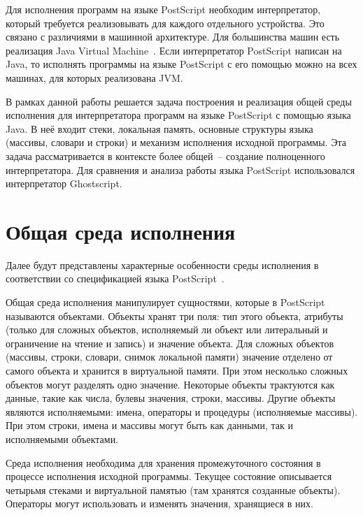 Для исполнения программ на языке PostScript необходим интерпретатор, который требуется реализовывать для каждого отдельного устройства. Это связано с различиями в машинной архитектуре. Для большинства машин есть реализация Java Virtual Machine~\cite{pjvms}. Если интерпретатор PostScript написан на Java, то исполнять программы на языке PostScript с его помощью можно на всех машинах, для которых реализована JVM.

В рамках данной работы решается задача построения и реализация общей среды исполнения для интерпретатора программ на языке PostScript с помощью языка Java. В неё входит стеки, локальная память, основные структуры языка (массивы, словари и строки) и механизм исполнения исходной программы. Эта задача рассматривается в контексте более общей~-- создание полноценного интерпретатора.  Для сравнения и анализа работы языка PostScript использовался интерпретатор Ghostscript.


\section{Общая среда исполнения}
Далее будут представлены характерные особенности среды исполнения в соответствии со спецификацией языка PostScript~\cite{PLRM}.

Общая среда исполнения манипулирует сущностями, которые в PostScript называются  объектами. Объекты хранят три поля: тип этого объекта, атрибуты (только для сложных объектов, исполняемый ли объект или литеральный и ограничение на чтение и запись) и значение объекта. Для сложных объектов (массивы, строки, словари, снимок локальной памяти) значение отделено от самого объекта и хранится в виртуальной памяти. При этом несколько сложных объектов могут разделять одно значение. Некоторые объекты трактуются как данные, такие как числа, булевы значения, строки, массивы. Другие объекты являются исполняемыми: имена, операторы и процедуры (исполняемые массивы). При этом строки, имена и массивы могут быть как данными, так и исполняемыми объектами.

Среда исполнения необходима для хранения промежуточного состояния в процессе исполнения исходной программы. Текущее состояние описывается четырьмя стеками и виртуальной памятью (там хранятся созданные объекты). Операторы могут использовать и изменять значения, хранящиеся в них.

